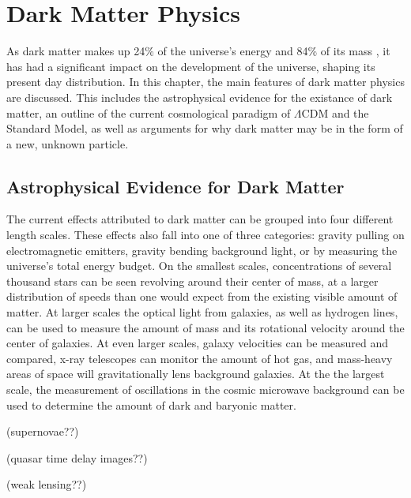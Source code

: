 \cleartooddpage[\thispagestyle{empty}]
\chapter{Dark Matter Physics}

  As dark matter makes up 24\% of the universe's energy and 84\% of its mass \cite{wmap9year}, it has had a significant impact on the development of the universe, shaping its present day distribution.
  In this chapter, the main features of dark matter physics are discussed.
  This includes the astrophysical evidence for the existance of dark matter, an outline of the current cosmological paradigm of $\Lambda$CDM and the Standard Model, as well as arguments for why dark matter may be in the form of a new, unknown particle.

\section{Astrophysical Evidence for Dark Matter}
  The current effects attributed to dark matter can be grouped into four different length scales.
  These effects also fall into one of three categories: gravity pulling on electromagnetic emitters, gravity bending background light, or by measuring the universe's total energy budget.
  On the smallest scales, concentrations of several thousand stars can be seen revolving around their center of mass, at a larger distribution of speeds than one would expect from the existing visible amount of matter.
  At larger scales the optical light from galaxies, as well as hydrogen lines, can be used to measure the amount of mass and its rotational velocity around the center of galaxies.
  At even larger scales, galaxy velocities can be measured and compared, x-ray telescopes can monitor the amount of hot gas, and mass-heavy areas of space will gravitationally lens background galaxies.
  At the the largest scale, the measurement of oscillations in the cosmic microwave background can be used to determine the amount of dark and baryonic matter.
  
  {\color{red}(supernovae??)}

  {\color{red}(quasar time delay images??)}

  {\color{red}(weak lensing??)}
  

